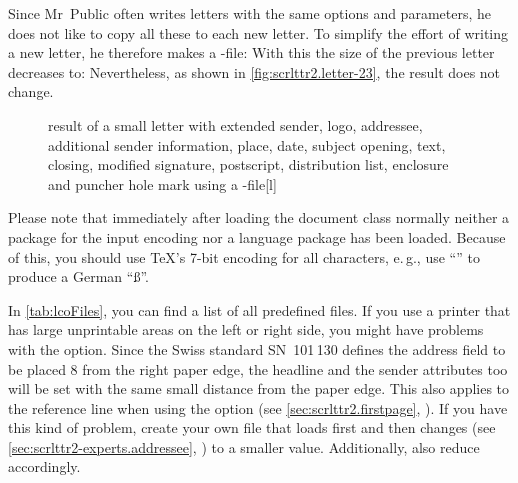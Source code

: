 \begin{Example}
  Since Mr~Public often writes letters with the same options and parameters,
  he does not like to copy all these to each new letter. To simplify the effort
  of writing a new letter, he therefore makes a -file:%
  With this the size of the previous letter decreases to:
  Nevertheless, as shown in \autoref{fig:scrlttr2.letter-23}, the result
  does not change.
  \begin{figure}
    \setcapindent{0pt}%
    \begin{captionbeside}
      {result of a small letter with extended sender, logo, addressee,
        additional sender information, place, date, subject opening, text,
        closing, modified signature, postscript, distribution list, enclosure
        and puncher hole mark using a -file}[l]
    \end{captionbeside}
    \label{fig:scrlttr2.letter-23}
  \end{figure}
\end{Example}

Please note that immediately after loading the
document class normally neither a package for the input encoding nor a
language package has been loaded. Because of this, you should use \TeX's 7-bit
encoding for all characters, e.\,g., use ``'' to produce a German
``\ss''.

In \autoref{tab:lcoFiles},  you can find a list of
all predefined  files. If you use a printer
that has large unprintable areas on the left or right side, you might have
problems with the  option. Since the Swiss standard
SN~101\,130 defines the address field to be placed 8 from the right
paper edge, the headline and the sender attributes too will be set with the
same small distance from the paper edge. This also applies to the reference
line when using the  option (see
\autoref{sec:scrlttr2.firstpage},
). If you have this
kind of problem, create your own  file that loads  first
and then changes  (see
\autoref{sec:scrlttr2-experts.addressee},
) to a smaller
value. Additionally, also reduce  accordingly.%

